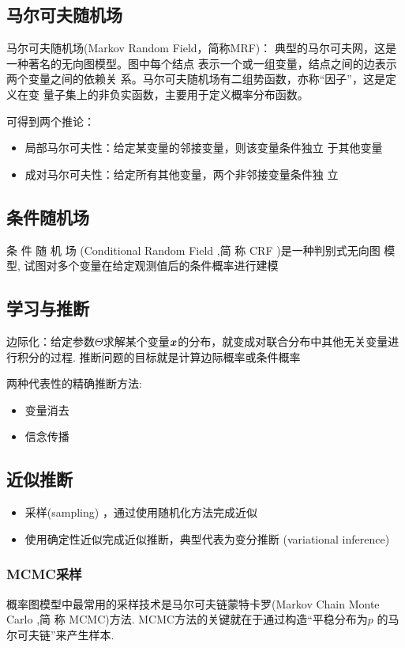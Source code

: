 \subsection{马尔可夫随机场}
马尔可夫随机场(Markov Random Field，简称MRF)：
典型的马尔可夫网，这是一种著名的无向图模型。图中每个结点
表示一个或一组变量，结点之间的边表示两个变量之间的依赖关
系。马尔可夫随机场有二组势函数，亦称“因子”，这是定义在变
量子集上的非负实函数，主要用于定义概率分布函数。

可得到两个推论：
\begin{itemize}
    \item 局部马尔可夫性：给定某变量的邻接变量，则该变量条件独立
    于其他变量
    \item 成对马尔可夫性：给定所有其他变量，两个非邻接变量条件独
    立
\end{itemize}


\subsection{条件随机场}
条 件 随 机 场 (Conditional Random Field ,简 称 CRF )是一种判别式无向图
模 型, 试图对多个变量在给定观测值后的条件概率进行建模

\subsection{学习与推断}
边际化：给定参数$\Theta$求解某个变量$\bm{x}$的分布，就变成对联合分布中其他无关变量进行积分的过程. 推断问题的目标就是计算边际概率或条件概率

两种代表性的精确推断方法:
\begin{itemize}
    \item 变量消去
    \item 信念传播
\end{itemize}

\subsection{近似推断}
\begin{itemize}
    \item 采样(sampling) ，通过使用随机化方法完成近似
    \item 使用确定性近似完成近似推断，典型代表为变分推断
    (variational inference)
\end{itemize}
\subsubsection{MCMC采样}
概率图模型中最常用的采样技术是马尔可夫链蒙特卡罗(Markov Chain Monte Carlo ,简 称 MCMC)方法. MCMC方法的关键就在于通过构造“平稳分布为$p$ 的马尔可夫链”来产生样本. 

